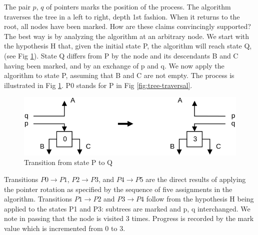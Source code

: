 The pair $p$, $q$ of pointers marks the position of the process. The algorithm traverses
the tree in a left to right, depth 1st fashion. When it returns to the root, all nodes
have been marked. How are these claims convincingly supported? The best way is by analyzing
the algorithm at an arbitrary node. We start with the hypothesis H that, given the initial
state P, the algorithm will reach state Q, (see Fig \ref{fig:transition}). State Q differs
from P by the node and its descendants B and C having been marked, and by an exchange of p
and q. We now apply the algorithm to state P, assuming that B and C are not empty. The process
is illustrated in Fig \ref{fig:transition}. P0 stands for P in Fig \ref{fig:tree-traversal}.
\begin{figure}[h!]
  \centering
  \includegraphics[width=\textwidth]{i/u}
  \caption{Transition from state P to Q}
  \label{fig:transition}
\end{figure}
Transitions $P0 \rightarrow P1$, $P2 \rightarrow P3$, and $P4 \rightarrow P5$ are the direct
results of applying the pointer rotation as specified by the sequence of five assignments
in the algorithm. Transitions $P1 \rightarrow P2$ and $P3 \rightarrow P4$ follow from the
hypothesis H being applied to the states P1 and P3: subtrees are marked and p, q interchanged.
We note in passing that the node is visited 3 times. Progress is recorded by the mark value
which is incremented from 0 to 3.

